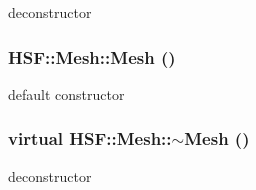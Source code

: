 deconstructor \hypertarget{classHSF_1_1Mesh_acbd942f68387a832b8f7d5927db54eea}{
\subsubsection[{Mesh}]{\setlength{\rightskip}{0pt plus 5cm}HSF::Mesh::Mesh ()}}
\label{classHSF_1_1Mesh_acbd942f68387a832b8f7d5927db54eea}


default constructor \hypertarget{classHSF_1_1Mesh_a3920b19d7969a8bb5d1eb505ec9f43b4}{
\subsubsection[{$\sim$Mesh}]{\setlength{\rightskip}{0pt plus 5cm}virtual HSF::Mesh::$\sim$Mesh ()}}
\label{classHSF_1_1Mesh_a3920b19d7969a8bb5d1eb505ec9f43b4}


deconstructor 


